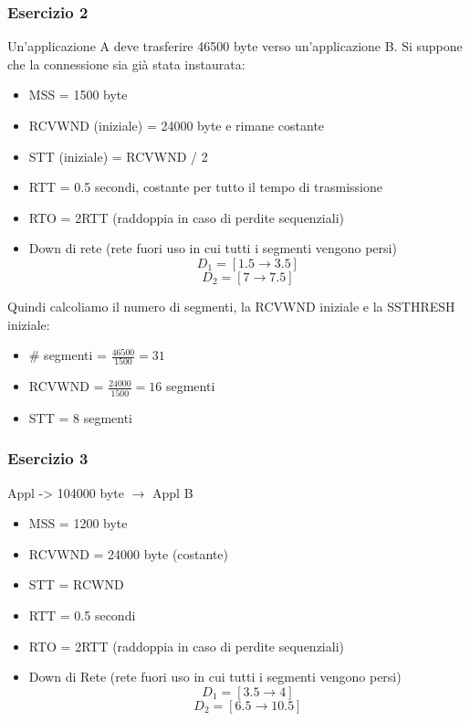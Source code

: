 \documentclass[a4paper]{article}
\begin{document}
\subsubsection{Esercizio 2}

Un'applicazione A deve trasferire 46500 byte verso un'applicazione B. Si suppone che la connessione sia già stata instaurata:
\begin{itemize}
    \item MSS = 1500 byte
    \item RCVWND (iniziale) = 24000 byte e rimane costante 
    \item STT (iniziale) = RCVWND / 2
    \item RTT = 0.5 secondi, costante per tutto il tempo di trasmissione
    \item RTO = 2RTT (raddoppia in caso di perdite sequenziali)
    \item Down di rete (rete fuori uso in cui tutti i segmenti vengono persi)
    \[D_1 = [1.5 \rightarrow 3.5]\]
    \[D_2 = [7 \rightarrow 7.5]\]
\end{itemize}
Quindi calcoliamo il numero di segmenti, la RCVWND iniziale e la SSTHRESH iniziale:
\begin{itemize}
    \item \# segmenti = $\frac{46500}{1500} = 31$ 
    \item RCVWND = $\frac{24000}{1500} = 16$ segmenti
    \item STT = 8 segmenti
\end{itemize}

\subsubsection{Esercizio 3}
Appl -> 104000 byte $\rightarrow$ Appl B
\begin{itemize}
    \item MSS = 1200 byte
    \item RCVWND = 24000 byte (costante)
    \item STT = RCWND
    \item RTT = 0.5 secondi
    \item RTO = 2RTT (raddoppia in caso di perdite sequenziali)
    \item Down di Rete (rete fuori uso in cui tutti i segmenti vengono persi)
    \[D_1 = [3.5 \rightarrow 4]\]
    \[D_2 = [6.5 \rightarrow 10.5]\]
\end{itemize}
\end{document}
